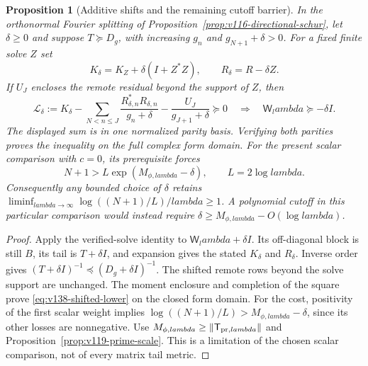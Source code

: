 \documentclass[11pt]{article}
\def\lambda{lambda}%
\newtheorem{proposition}[theorem]{Proposition}
\theoremstyle{remark}
\begin{document}
\begin{proposition}[Additive shifts and the remaining cutoff barrier]
\label{prop:v138-shifted-floor}
In the orthonormal Fourier splitting of
Proposition~\ref{prop:v116-directional-schur}, let $\delta\ge0$ and
suppose $T\succeq D_g$, with increasing $g_n$ and
$g_{N+1}+\delta>0$. For a fixed finite solve $Z$ set
\[
 K_\delta=K_Z+\delta(I+Z^*Z),\qquad
 R_\delta=R-\delta Z.
\]
If $U_J$ encloses the remote residual beyond the support of $Z$, then
\begin{equation}\label{eq:v138-shifted-lower}
 \mathcal L_\delta:=K_\delta-
 \sum_{N<n\le J}\frac{R_{\delta,n}^*R_{\delta,n}}{g_n+\delta}
 -\frac{U_J}{g_{J+1}+\delta}\succeq0
 \quad\Longrightarrow\quad
 \mathsf W_\lambda\succeq-\delta I.
\end{equation}
The displayed sum is in one normalized parity basis. Verifying both
parities proves the inequality on the full complex form domain.
For the present scalar comparison with $c=0$, its prerequisite forces
\begin{equation}\label{eq:v138-shifted-cost}
 N+1>L\exp(M_{\phi,\lambda}-\delta),\qquad L=2\log\lambda.
\end{equation}
Consequently any bounded choice of $\delta$ retains
$\liminf_{\lambda\to\infty}\log((N+1)/L)/\lambda\ge1$.
A polynomial cutoff in this particular comparison would instead
require $\delta\ge M_{\phi,\lambda}-O(\log\lambda)$.
\end{proposition}
\begin{proof}
Apply the verified-solve identity to $\mathsf W_\lambda+\delta I$.
Its off-diagonal block is still $B$, its tail is $T+\delta I$, and
expansion gives the stated $K_\delta$ and $R_\delta$. Inverse order
gives $(T+\delta I)^{-1}\preceq(D_g+\delta I)^{-1}$.
The shifted remote rows beyond the solve support are unchanged.
The moment enclosure and completion of the square prove
\eqref{eq:v138-shifted-lower} on the closed form domain.
For the cost, positivity of the first scalar weight implies
$\log((N+1)/L)>M_{\phi,\lambda}-\delta$, since its other losses
are nonnegative. Use
$M_{\phi,\lambda}\ge\|\mathsf T_{{\rm pr},\lambda}\|$ and
Proposition~\ref{prop:v119-prime-scale}. This is a limitation of
the chosen scalar comparison, not of every matrix tail metric.
\end{proof}
\end{document}
